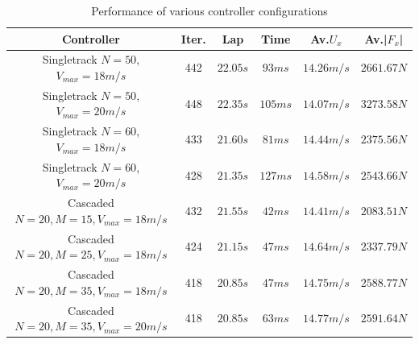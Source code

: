 \documentclass[a4paper, onecolumn, 12pt]{article}
\begin{document}
\begin{table}[h] 
    \centering
    \caption{Performance of various controller configurations} \label{simulations}
    \begin{tabular}{|c||c|c|c|c|c|}
        \hline
        \textbf{Controller} & \textbf{Iter.} & \textbf{Lap} & \textbf{Time} & \textbf{Av.$U_x$} & \textbf{Av.|$F_x$|} \\ [0.5ex] 
        \hline
        \hline
        Singletrack $N=50$, $V_{max}=18m/s$ & 442 & $22.05 s$ & $93 ms$ & $14.26 m/s$ & $2661.67 N$\\
        \hline
        Singletrack $N=50$, $V_{max}=20m/s$ & 448 & $22.35 s$ & $105 ms$ & $14.07 m/s$ & $3273.58 N$\\
        \hline
        Singletrack $N=60$, $V_{max}=18m/s$ & 433 & $21.60 s$ & $81 ms$ & $14.44 m/s$ & $2375.56 N$\\
        \hline
        Singletrack $N=60$, $V_{max}=20m/s$ & 428 & $21.35 s$ & $127 ms$ & $14.58 m/s$ & $2543.66 N$\\
        \hline
        Cascaded $N=20, M=15, V_{max}=18m/s$ & 432 & $21.55 s$ & $42 ms$ & $14.41 m/s$ & $2083.51 N$\\
        \hline
        Cascaded $N=20, M=25, V_{max}=18m/s$ & 424 & $21.15 s$ & $47 ms$ & $14.64 m/s$ & $2337.79 N$\\
        \hline
        Cascaded $N=20, M=35, V_{max}=18m/s$ & 418 & $20.85 s$ & $47 ms$ & $14.75 m/s$ & $2588.77 N$\\
        \hline
        Cascaded $N=20, M=35, V_{max}=20m/s$ & 418 & $20.85 s$ & $63 ms$ & $14.77 m/s$ & $2591.64 N$\\
        \hline
    \end{tabular}
\end{table}
\end{document}

